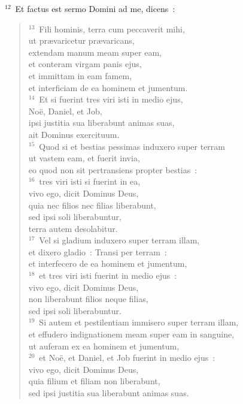 ${}^{12}$~Et factus est sermo Domini ad me, dicens~:
\begin{flushleft}\begin{verse}${}^{13}$~Fili hominis, terra cum peccaverit mihi,\\ ut pr\ae varicetur pr\ae varicans,\\ extendam manum meam super eam,\\ et conteram virgam panis ejus,\\ et immittam in eam famem,\\ et interficiam de ea hominem et jumentum.\\
${}^{14}$~Et si fuerint tres viri isti in medio ejus,\\ No\"e, Daniel, et Job,\\ ipsi justitia sua liberabunt animas suas,\\ ait Dominus exercituum.\\
${}^{15}$~Quod si et bestias pessimas induxero super terram\\ ut vastem eam, et fuerit invia,\\ eo quod non sit pertransiens propter bestias~:\\
${}^{16}$~tres viri isti si fuerint in ea,\\ vivo ego, dicit Dominus Deus,\\ quia nec filios nec filias liberabunt,\\ sed ipsi soli liberabuntur,\\ terra autem desolabitur.\\
${}^{17}$~Vel si gladium induxero super terram illam,\\ et dixero gladio~: Transi per terram~:\\ et interfecero de ea hominem et jumentum,\\
${}^{18}$~et tres viri isti fuerint in medio ejus~:\\ vivo ego, dicit Dominus Deus,\\ non liberabunt filios neque filias,\\ sed ipsi soli liberabuntur.\\
${}^{19}$~Si autem et pestilentiam immisero super terram illam,\\ et effudero indignationem meam super eam in sanguine,\\ ut auferam ex ea hominem et jumentum,\\
${}^{20}$~et No\"e, et Daniel, et Job fuerint in medio ejus~:\\ vivo ego, dicit Dominus Deus,\\ quia filium et filiam non liberabunt,\\ sed ipsi justitia sua liberabunt animas suas.\\

\end{verse}
\end{flushleft}
